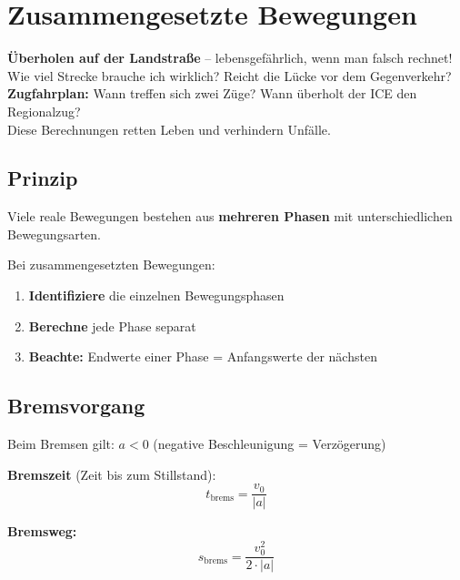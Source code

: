 \documentclass[11pt,a4paper]{article}
\begin{document}
\newpage
\section{Zusammengesetzte Bewegungen}

\begin{alltag}
\textbf{Überholen auf der Landstraße} -- lebensgefährlich, wenn man falsch rechnet!\\[0.3em]
Wie viel Strecke brauche ich wirklich? Reicht die Lücke vor dem Gegenverkehr?\\[0.3em]
\textbf{Zugfahrplan:} Wann treffen sich zwei Züge? Wann überholt der ICE den Regionalzug?\\[0.3em]
Diese Berechnungen retten Leben und verhindern Unfälle.
\end{alltag}

\subsection{Prinzip}

Viele reale Bewegungen bestehen aus \textbf{mehreren Phasen} mit unterschiedlichen Bewegungsarten.

\begin{merksatz}
Bei zusammengesetzten Bewegungen:
\begin{enumerate}
\item \textbf{Identifiziere} die einzelnen Bewegungsphasen
\item \textbf{Berechne} jede Phase separat
\item \textbf{Beachte:} Endwerte einer Phase = Anfangswerte der nächsten
\end{enumerate}
\end{merksatz}

\subsection{Bremsvorgang}

Beim Bremsen gilt: $a < 0$ (negative Beschleunigung = Verzögerung)

\begin{formelbox}[Bremsformeln]
\textbf{Bremszeit} (Zeit bis zum Stillstand):
\[
t_{\text{brems}} = \frac{v_0}{|a|}
\]

\textbf{Bremsweg:}
\[
s_{\text{brems}} = \frac{v_0^2}{2 \cdot |a|}
\]
\end{formelbox}
\end{document}
